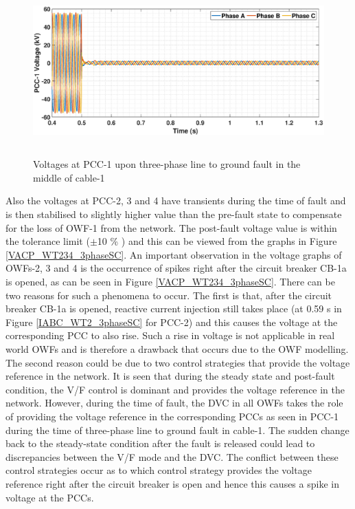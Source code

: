 \begin{figure}[H]
    \includegraphics[height = 6.5cm,width = \textwidth]{Diagrams/Chapter_5/VABC_WT1_3phaseSC.eps}
    \caption{Voltages at PCC-1 upon three-phase line to ground fault in the middle of cable-1}
    \label{VABC_WT1_3phaseSC}
\end{figure}

Also the voltages at \gls{PCC}-2, 3 and 4 have transients during the time of fault and is then stabilised to slightly higher value than the pre-fault state to compensate for the loss of \gls{OWF}-1 from the network. The post-fault voltage value is within the tolerance limit ($\pm$10 \% ) and this can be viewed from the graphs in Figure \ref{VACP_WT234_3phaseSC}. An important observation in the voltage graphs of \gls{OWF}s-2, 3 and 4 is the occurrence of spikes right after the circuit breaker CB-1a is opened, as can be seen in Figure \ref{VACP_WT234_3phaseSC}. 
There can be two reasons for such a phenomena to occur. The first is that, after the circuit breaker CB-1a is opened, reactive current injection still takes place (at 0.59 s in Figure \ref{IABC_WT2_3phaseSC} for \gls{PCC}-2) and this causes the voltage at the corresponding \gls{PCC} to also rise. Such a rise in voltage is not applicable in real world \gls{OWF}s and is therefore a drawback that occurs due to the \gls{OWF} modelling. The second reason could be due to two control strategies that provide the voltage reference in the network. It is seen that during the steady state and post-fault condition, the V/F control is dominant and provides the voltage reference in the network. However, during the time of fault, the \gls{DVC} in all \gls{OWF}s takes the role of providing the voltage reference in the corresponding \gls{PCC}s as seen in \gls{PCC}-1 during the time of three-phase line to ground fault in cable-1. The sudden change back to the steady-state condition after the fault is released could lead to discrepancies between the V/F mode and the \gls{DVC}. The conflict between these control strategies occur as to which control strategy provides the voltage reference right after the circuit breaker is open and hence this causes a spike in voltage at the \gls{PCC}s.

